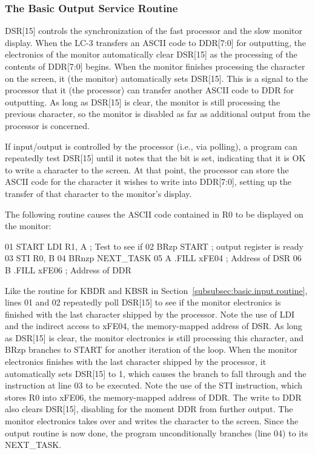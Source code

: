 \documentclass{patt}
\begin{document}
\FloatBarrier
\subsubsection{The Basic Output Service Routine}
\label{subsubsec:basic.output.routine}

DSR[15] controls the synchronization of the fast processor and the
slow monitor display.  When the LC-3 transfers an ASCII code to
DDR[7:0] for outputting, the electronics of the monitor automatically
clear DSR[15] as the processing of the contents of DDR[7:0] begins.
    When the monitor finishes processing the character on
the screen, it (the monitor) automatically sets DSR[15]. This is a
signal to the processor that it (the processor) can transfer another
ASCII code to DDR for outputting. As long as DSR[15] is clear, the
monitor is still processing the previous character, so the monitor is
disabled as far as additional output from the processor is concerned.

If input/output is controlled by the processor (i.e., via polling),
a program can repeatedly test DSR[15] until it notes that the bit
is set, indicating that it is OK to write a character to the screen.
At that point, the processor can store the ASCII code for the
character it wishes to write into DDR[7:0], setting up the transfer of
that character to the monitor's display.

The following routine causes the ASCII code contained in R0 to be
displayed on the monitor:

\begin{colorverbatim}
01     START   LDI     R1, A         ; Test to see if
02             BRzp    START         ; output register is ready
03             STI     R0, B
04             BRnzp   NEXT_TASK
05     A       .FILL   xFE04         ; Address of DSR
06     B       .FILL   xFE06         ; Address of DDR
\end{colorverbatim}

\noindent Like the routine for KBDR and KBSR in
Section~\ref{subsubsec:basic.input.routine}, lines 01 and 02
repeatedly poll DSR[15] to see if the monitor electronics is finished
with the last character shipped by the processor.  Note the use of
LDI and the indirect access to xFE04, the memory-mapped address of
DSR. As long as DSR[15] is clear, the monitor electronics is still
processing this character, and BRzp branches to START for another
iteration of the loop.  When the monitor electronics finishes with the
last character shipped by the processor, it automatically sets DSR[15]
to 1, which causes the branch to fall through and the instruction at
line 03 to be executed.  Note the use of the STI instruction, which
stores R0 into xFE06, the \hbox{memory-mapped} address of DDR.  The
write to DDR also clears DSR[15], disabling for the moment DDR from
further output.  The monitor electronics takes over and writes the
character to the screen.  Since the output routine is now done, the
program unconditionally branches (line 04) to its NEXT\_TASK.
\end{document}
